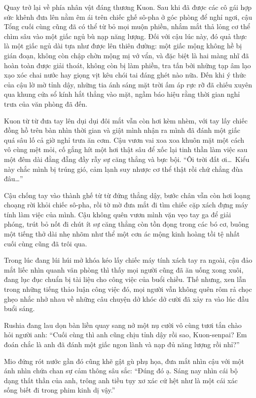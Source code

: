 \documentclass[../main.tex]{subfiles}
\begin{document}
\ct

Quay trở lại về phía nhân vật đáng thương Kuon. Sau khi đã được các cô gái hợp sức khênh đưa lên nằm êm ái trên chiếc ghế sô-pha ở góc phòng để nghỉ ngơi, cậu Tổng cuối cùng cũng đã có thể từ bỏ mọi muộn phiền, nhắm mắt thả lỏng cơ thể chìm sâu vào một giấc ngủ bù nạp năng lượng. Đối với cậu lúc này, đó quả thực là một giấc ngủ dài tựa như được lên thiên đường: một giấc mộng không hề bị gián đoạn, không còn chập chờn mộng mị vớ vẩn, và đặc biệt là hai màng nhĩ đã hoàn toàn được giải thoát, không còn bị làm phiền, tra tấn bởi những tạp âm lạo xạo xóc chai nước hay giọng vịt kêu chói tai đáng ghét nào nữa. Đến khi ý thức của cậu lờ mờ tỉnh dậy, những tia ánh sáng mặt trời ấm áp rực rỡ đã chiếu xuyên qua khung cửa sổ kính hắt thẳng vào mặt, ngầm báo hiệu rằng thời gian nghỉ trưa của văn phòng đã đến.

Kuon từ từ đưa tay lên dụi dụi đôi mắt vẫn còn hơi kèm nhèm, với tay lấy chiếc đồng hồ trên bàn nhìn thời gian và giật mình nhận ra mình đã đánh một giấc quá sâu lố cả giờ nghỉ trưa ăn cơm. Cậu vươn vai xoa xoa khuôn mặt một cách vô cùng mệt mỏi, cố gắng hít một hơi thật sâu để xốc lại tinh thần làm việc sau một đêm dài đằng đẵng đầy rẫy sự căng thẳng và bực bội. ``Ôi trời đất ơi\dots\ Kiểu này chắc mình bị trúng gió, cảm lạnh suy nhược cơ thể thật rồi chứ chẳng đùa đâu\dots''

Cậu chống tay vào thành ghế từ từ đứng thẳng dậy, bước chân vẫn còn hơi loạng choạng rời khỏi chiếc sô-pha, rồi tờ mờ đưa mắt đi tìm chiếc cặp xách đựng máy tính làm việc của mình. Cậu không quên vươn mình vặn vẹo tay ga để giải phóng, trút bỏ nốt đi chút ít sự căng thẳng còn tồn đọng trong các bó cơ, buông một tiếng thở dài nhẹ nhõm như thể một cơn ác mộng kinh hoàng tồi tệ nhất cuối cùng cũng đã trôi qua.

Trong lúc đang lúi húi mở khóa kéo lấy chiếc máy tính xách tay ra ngoài, cậu đảo mắt liếc nhìn quanh văn phòng thì thấy mọi người cũng đã ăn uống xong xuôi, đang lục đục chuẩn bị tài liệu cho công việc của buổi chiều. Thế nhưng, xen lẫn trong những tiếng thảo luận công việc đó, mọi người vẫn không quên rôm rả chọc ghẹo nhắc nhở nhau về những câu chuyện dở khóc dở cười đã xảy ra vào lúc đầu buổi sáng.

Rushia đang lau dọn bàn liền quay sang nở một nụ cười vô cùng tươi tắn chào hỏi người anh: ``Cuối cùng thì anh cũng chịu tỉnh dậy rồi sao, Kuon-senpai? Em đoán chắc là anh đã đánh một giấc ngon lành và nạp đủ năng lượng rồi nhỉ?''

Mio đứng rót nước gần đó cũng khẽ gật gù phụ họa, đưa mắt nhìn cậu với một ánh nhìn chứa chan sự cảm thông sâu sắc: ``Đúng đó ạ. Sáng nay nhìn cái bộ dạng thất thần của anh, trông anh tiều tụy xơ xác cứ hệt như là một cái xác sống biết đi trong phim kinh dị vậy.''
\end{document}
